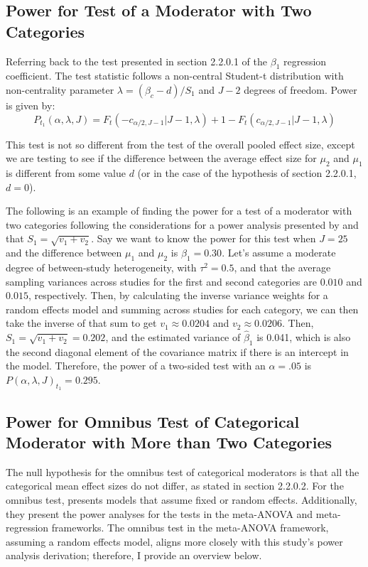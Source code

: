 \subsection{Power for Test of a Moderator with Two Categories}

Referring back to the test presented in section 2.2.0.1 of the $\beta_1$ regression coefficient. The test statistic follows a non-central Student-t distribution with non-centrality parameter $\lambda =  (\beta_c - d) /  S_1$ and $J-2$ degrees of freedom. Power is given by:
\begin{equation}
   P_{t_1}(\alpha, \lambda, J) =  F_t(-c_{\alpha/2,J-1}|J-1,\lambda) + 1- F_t(c_{\alpha/2,J-1}|J-1,\lambda)
\end{equation}

This test is not so different from the test of the overall pooled effect size, except we are testing to see if the difference between the average effect size for $\mu_2$ and $\mu_1$ is different from some value $d$ (or in the case of the hypothesis of section 2.2.0.1, $d=0$).

The following is an example of finding the power for a test of a moderator with two categories following the considerations for a power analysis presented by \textcite{hedges2004} and that $S_1 = \sqrt{v_1 + v_2}$. Say we want to know the power for this test when $J=25$ and the difference between $\mu_1$ and $\mu_2$ is $\beta_1 = 0.30$. Let's assume a moderate degree of between-study heterogeneity, with $\tau^2 = 0.5$, and that the average sampling variances across studies for the first and second categories are $0.010$ and $0.015$, respectively. Then, by calculating the inverse variance weights for a random effects model and summing across studies for each category, we can then take the inverse of that sum to get $v_1 \approx 0.0204$ and $v_2 \approx 0.0206$. Then, $S_1 = \sqrt{v_1 + v_2}= 0.202$, and the estimated variance of $\hat{\beta}_1$ is 0.041, which is also the second diagonal element of the covariance matrix if there is an intercept in the model. Therefore, the power of a two-sided test with an $\alpha=.05$ is $P(\alpha, \lambda, J)_{t_1}  = 0.295$.

\subsection{Power for Omnibus Test of Categorical Moderator with More than Two Categories}

The null hypothesis for the omnibus test of categorical moderators is that all the categorical mean effect sizes do not differ, as stated in section 2.2.0.2. For the omnibus test, \textcite{hedges2004} presents models that assume fixed or random effects. Additionally, they present the power analyses for the tests in the meta-ANOVA and meta-regression frameworks. The omnibus test in the meta-ANOVA framework, assuming a random effects model, aligns more closely with this study's power analysis derivation; therefore, I provide an overview below.

